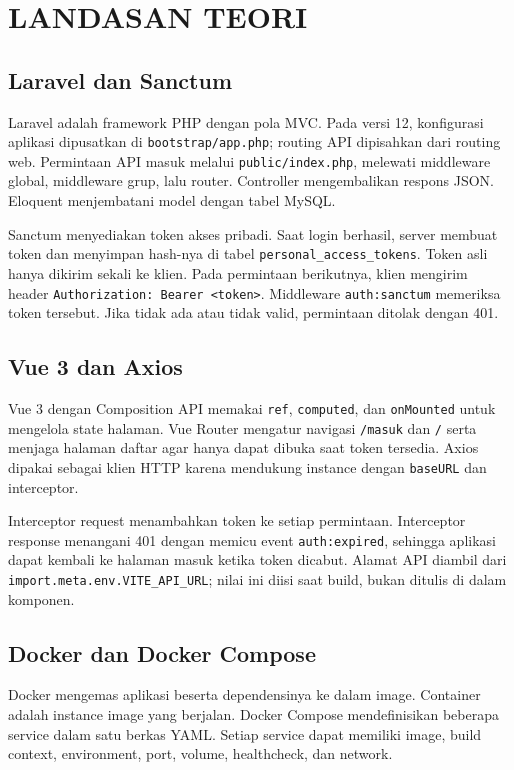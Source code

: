 \documentclass[12pt,a4paper,oneside]{book}
\begin{document}
\chapter{LANDASAN TEORI}
\label{chap:teori}

\section{Laravel dan Sanctum}

Laravel adalah framework PHP dengan pola MVC. Pada versi 12, konfigurasi aplikasi
dipusatkan di \texttt{bootstrap/app.php}; routing API dipisahkan dari routing web.
Permintaan API masuk melalui \texttt{public/index.php}, melewati middleware global,
middleware grup, lalu router. Controller mengembalikan respons JSON. Eloquent
menjembatani model dengan tabel MySQL.

Sanctum menyediakan token akses pribadi. Saat login berhasil, server membuat token
dan menyimpan hash-nya di tabel \texttt{personal\_access\_tokens}. Token asli hanya
dikirim sekali ke klien. Pada permintaan berikutnya, klien mengirim header
\texttt{Authorization: Bearer <token>}. Middleware \texttt{auth:sanctum} memeriksa
token tersebut. Jika tidak ada atau tidak valid, permintaan ditolak dengan 401.

\section{Vue 3 dan Axios}

Vue 3 dengan Composition API memakai \texttt{ref}, \texttt{computed}, dan
\texttt{onMounted} untuk mengelola state halaman. Vue Router mengatur navigasi
\texttt{/masuk} dan \texttt{/} serta menjaga halaman daftar agar hanya dapat dibuka
saat token tersedia. Axios dipakai sebagai klien HTTP karena mendukung instance
dengan \texttt{baseURL} dan interceptor.

Interceptor request menambahkan token ke setiap permintaan. Interceptor response
menangani 401 dengan memicu event \texttt{auth:expired}, sehingga aplikasi dapat
kembali ke halaman masuk ketika token dicabut. Alamat API diambil dari
\texttt{import.meta.env.VITE\_API\_URL}; nilai ini diisi saat build, bukan ditulis
di dalam komponen.

\section{Docker dan Docker Compose}

Docker mengemas aplikasi beserta dependensinya ke dalam image. Container adalah
instance image yang berjalan. Docker Compose mendefinisikan beberapa service dalam
satu berkas YAML. Setiap service dapat memiliki image, build context, environment,
port, volume, healthcheck, dan network.
\end{document}
